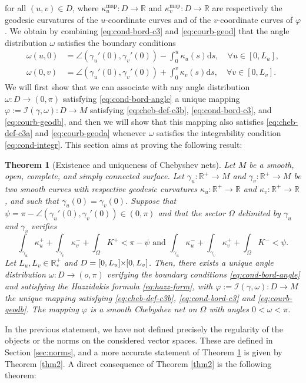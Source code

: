 \documentclass{article}
\newcommand{\I}{\mathcal{I}}
\newcommand{\PLH}{{\mkern-1mu\times\mkern-1mu}}
\newcommand{\Times}{\PLH}
\newcommand{\R}{\mathbb{R}}
\newcommand{\surf}{M}
\newcommand{\ko}{\kappa}
\newcommand{\kop}{\kappa^{\mathrm{map}}}
\newcommand{\ds}{\mathrm{d}s}
\newtheorem{theorem}{Theorem}
\theoremstyle{remark}
\theoremstyle{prpart}
\begin{document}
for all $(u,v)\in D$, where $\kop_u:D\to\R$ and $\kop_v:D\to\R$ are respectively the geodesic curvatures of the $u$-coordinate curves and of the $v$-coordinate curves of $\varphi$. We obtain by combining \eqref{eq:cond-bord-c3} and \eqref{eq:courb-geod} that the angle distribution $\omega$ satisfies the boundary conditions
\begin{subequations}\label{eq:cond-bord-angle}
\begin{align}
\omega(u, 0) &= \angle(\gamma_u'(0), \gamma_v'(0)) - \int_0^u\ko_u(s)\ds,\quad\forall u\in[0,L_u],\\
\omega(0,v) &= \angle(\gamma_u'(0), \gamma_v'(0)) + \int_0^v\ko_v(s)\ds,\quad\forall v\in[0,L_v].
\end{align}
\end{subequations}
We will first show that we can associate with any angle distribution $\omega:D\to(0,\pi)$ satisfying \eqref{eq:cond-bord-angle} a unique mapping $\varphi:=\I(\gamma,\omega):D\to\surf$ satisfying \eqref{eq:cheb-def-c3b}, \eqref{eq:cond-bord-c3}, and \eqref{eq:courb-geodb}, and then we will show that this mapping also satisfies \eqref{eq:cheb-def-c3a} and \eqref{eq:courb-geoda} whenever $\omega$ satisfies the integrability condition \eqref{eq:cond-integr}. This section aims at proving the following result:
\begin{theorem}[Existence and uniqueness of Chebyshev nets]\label{thm2inexact}
Let $\surf$ be a smooth, open, complete, and simply connected
surface. Let $\gamma_u:\R^+\to\surf$ and $\gamma_v:\R^+\to\surf$ be
two smooth curves with respective geodesic curvatures $\ko_u:\R^+\to\R$ and
$\ko_v:\R^+\to\R$, and such that $\gamma_u(0) = \gamma_v(0)$. Suppose
that $\psi=\pi-\angle(\gamma_u'(0),\gamma_v'(0))\in(0,\pi)$ and that
the sector $\Omega$ delimited by $\gamma_u$ and $\gamma_v$
verifies \[\int_{\gamma_u}{\ko_u^+} + \int_{\gamma_v}{\ko_v^-} +
\int_{\Omega}{K^+}<\pi-\psi \text{ and } \int_{\gamma_u}{\ko_u^-} +
\int_{\gamma_v}{\ko_v^+} + \int_{\Omega}{K^-}<\psi.\] Let
$L_u,L_v\in\R_\ast^+$ and $D=[0,L_u]\Times[0,L_v]$. Then, there exists
a unique angle distribution $\omega:D\to(o,\pi)$ verifying the
boundary conditions \eqref{eq:cond-bord-angle} and satisfying the
Hazzidakis formula \eqref{eq:hazz-form}, with
$\varphi:=\I(\gamma,\omega): D\to\surf$ the unique mapping satisfying
\eqref{eq:cheb-def-c3b}, \eqref{eq:cond-bord-c3} and
\eqref{eq:courb-geodb}. The mapping $\varphi$ is a smooth Chebyshev net on
$\Omega$ with angles $0<\omega<\pi$.
\end{theorem}
In the previous statement, we have not defined precisely the regularity of the objects or the norms on the considered vector spaces. These are defined in Section \ref{sec:norms}, and a more accurate statement of Theorem \ref{thm2inexact} is given by Theorem \ref{thm2}. A direct consequence of Theorem \ref{thm2} is the following theorem:
\end{document}
